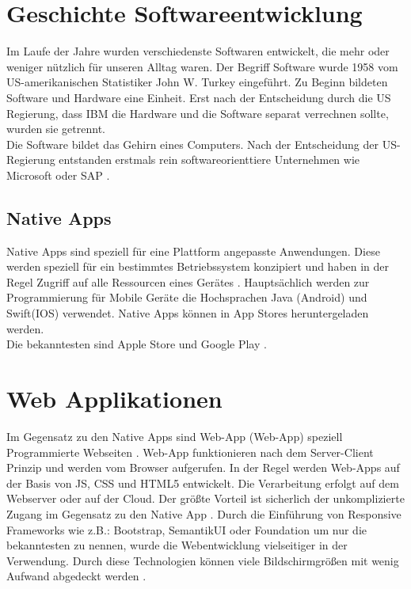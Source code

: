 \section{Geschichte Softwareentwicklung}
Im Laufe der Jahre wurden verschiedenste Softwaren entwickelt, die mehr oder weniger nützlich für unseren Alltag waren.
Der Begriff Software wurde 1958 vom US-amerikanischen Statistiker John W. Turkey eingeführt.
Zu Beginn bildeten Software und Hardware eine Einheit. Erst nach der Entscheidung durch die US Regierung, dass IBM die Hardware und die Software separat verrechnen sollte, wurden sie getrennt. \\
Die Software bildet das Gehirn eines Computers.
Nach der Entscheidung der US-Regierung entstanden erstmals rein softwareorienttiere Unternehmen wie Microsoft oder SAP \cite{Microsoft} \cite{SAP}. 

\subsection{Native Apps}\label{chap:Native Apps}
Native Apps sind speziell für eine Plattform angepasste Anwendungen. 
Diese werden speziell für ein bestimmtes Betriebssystem konzipiert und haben in der Regel Zugriff auf alle Ressourcen eines Gerätes \cite{NativeApp}.
Hauptsächlich werden zur Programmierung für Mobile Geräte die Hochsprachen Java (Android) und Swift(IOS) verwendet. Native Apps können in App Stores heruntergeladen  werden. \\Die bekanntesten sind Apple Store und Google Play \cite{Hochsprachen}.

\section{Web Applikationen}\label{chap:Webapplikationen}
Im Gegensatz zu den Native Apps sind \acl{Web-App} (\acs{Web-App}) speziell Programmierte Webseiten \cite{Hochsprachen}.
\acs{Web-App} funktionieren nach dem Server-Client Prinzip und werden vom Browser aufgerufen. In der Regel werden \acs{Web-App}s auf der Basis von \acs{JS}, \acs{CSS} und \acs{HTML}5 entwickelt. Die Verarbeitung erfolgt auf dem Webserver oder auf der Cloud. 
Der größte Vorteil ist sicherlich der unkomplizierte Zugang im Gegensatz zu den Native App \cite{WebApps}.
Durch die Einführung von Responsive Frameworks wie z.B.: Bootstrap, SemantikUI oder Foundation um nur die bekanntesten zu nennen, wurde die Webentwicklung vielseitiger in der Verwendung. Durch diese Technologien können viele Bildschirmgrößen mit wenig Aufwand abgedeckt werden \cite{CSS}. 

